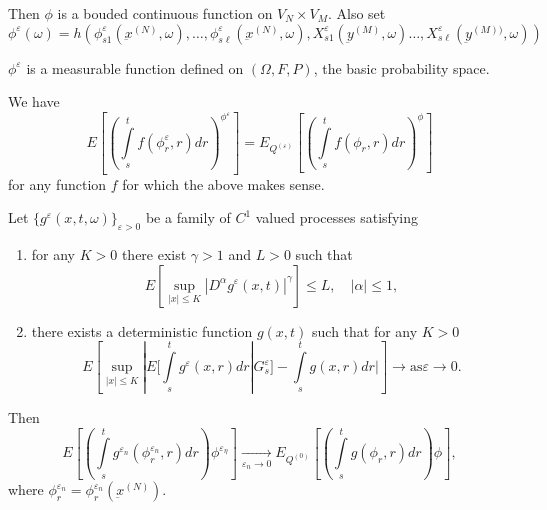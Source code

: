 Then $\phi$ is a bouded continuous function on $V_N \times V_M$. Also set 
\begin{equation*}
  \phi^{\varepsilon}(\omega) =
  h(\phi^{\varepsilon}_{s1}(\underbar{x}^{(N)}, \omega), \ldots,
  \phi^{\varepsilon}_{s \ell}(\underbar{x}^{(N)}, \omega),
  X^{\varepsilon}_{s1}(\underbar{y}^{(M)}, \omega) \ldots,
  X^{\varepsilon}_{s \ell}(\underbar{y}^{(M))}, 
\omega )) \tag{3.5.2}\label{c3:eq3.5.2}  
\end{equation*}

$\phi^{\varepsilon}$ is a measurable function defined on $(\Omega,
F,P)$, the basic probability space. 

We have 
\begin{equation*}
  E\left[\left( \int \limits^t_s
    f(\phi^{\varepsilon}_r,r)dr\right)^{\phi^\varepsilon}\right] =
  E_{Q^{(\varepsilon)}}\left[\left( \int 
    \limits^t_s f(\phi_r, r) dr 
\right)^{\phi}\right] \tag{3.5.3}\label{c3:eq3.5.3} 
\end{equation*}
for any function $f$ for which the above makes sense.

\setcounter{Lemma}{1}
\begin{Lemma}\label{c3:lem3.5.2}\pageoriginale%
  Let $\{ g^{\varepsilon}(x,t,\omega) \}_{\varepsilon > 0}$ be a
  family of $C^1$ valued processes satisfying  
  \begin{enumerate}[\rm (a)]
  \item for any $K > 0$ there exist $\gamma > 1$ and $L > 0$ such that 
    \begin{equation*}
      E\left[\sup_{|x| \leq K} |D^{\alpha}g^{\varepsilon}(x,t)|^{\gamma}\right]
      \leq L, \quad |\alpha| \leq 1, \tag{3.5.4}\label{c3:eq3.5.4} 
    \end{equation*}

  \item there exists a deterministic function $g(x,t)$ such that for
    any $K> 0$ 
    \begin{equation*}
      E\left[\sup_{|x| \leq K}  |E[ \int \limits^t_s g^{\varepsilon}(x,r)
          dr |G^{\varepsilon}_s] - \int \limits^t_s g(x,r) dr |\right] \to
      \text{as} \varepsilon\to 0.\tag{3.5.5}\label{c3:eq3.5.5} 
    \end{equation*}
  \end{enumerate}
\end{Lemma}

Then 
\begin{equation*}
  E\left[\left(\int \limits^t_s g^{\varepsilon_n}(\phi^{\varepsilon_n}_r,r)dr\right)
    \phi^{\varepsilon_\eta}\right] \xrightarrow[\varepsilon_n \to 0]{}
    E_{Q^{(0)}} \left[ \left( \int \limits^t_s g(\phi_r,r ) dr
      \right)\phi\right], \tag{3.5.6}\label{c3:eq3.5.6} 
\end{equation*}
where $\phi^{\varepsilon_n}_r = \phi^{\varepsilon_n}_r(\underbar{x}^{(N)})$.

